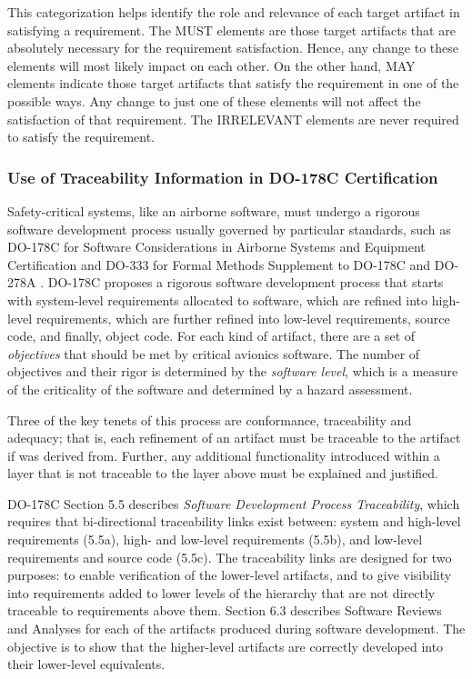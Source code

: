 This categorization helps identify the role and relevance of each target artifact in satisfying a requirement. The MUST elements are those target artifacts that are absolutely necessary for the requirement satisfaction. Hence, any change to these elements will most likely impact on each other. On the other hand, MAY elements indicate those target artifacts that satisfy the requirement in one of the possible ways.  Any change to just one of these elements will not affect the satisfaction of that requirement. The IRRELEVANT elements are never required to satisfy the requirement.

\subsubsection{Use of Traceability Information in DO-178C Certification}
Safety-critical systems, like an airborne software, must undergo a rigorous software development process usually governed by particular standards, such as DO-178C for Software Considerations in Airborne Systems and Equipment Certification \cite{DO178C} and DO-333 for Formal Methods Supplement to DO-178C and DO-278A \cite{DO333}.
DO-178C proposes a rigorous software development process that starts with system-level requirements allocated to software, which are refined into high-level requirements, which are further refined into low-level requirements, source code, and finally, object code. For each kind of artifact, there are a set of {\em objectives} that should be met by critical avionics software.  The number of objectives and their rigor is determined by the {\em software level}, which is a measure of the criticality of the software and determined by a hazard assessment.

Three of the key tenets of this process are conformance, traceability and adequacy; that is, each refinement of an artifact must be traceable to the artifact if was derived from. Further, any additional functionality introduced within a layer that is not traceable to the layer above must be explained and justified.

DO-178C Section 5.5 describes {\em Software Development Process Traceability}, which requires that bi-directional traceability links exist between: system and high-level requirements (5.5a), high- and low-level requirements (5.5b), and low-level requirements and source code (5.5c).  The traceability links are designed for two purposes: to enable verification of the lower-level artifacts, and to give visibility into requirements added to lower levels of the hierarchy that are not directly traceable to requirements above them.
Section 6.3 describes Software Reviews and Analyses for each of the artifacts produced during software development.   The objective is to show that the higher-level artifacts are correctly developed into their lower-level equivalents.

